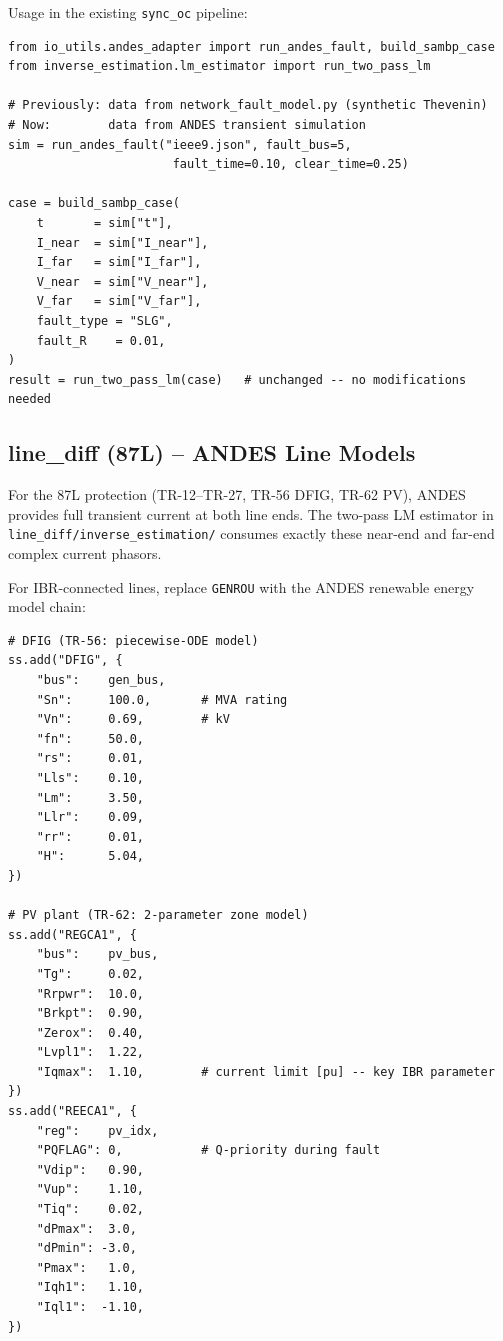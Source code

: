 \documentclass[11pt,a4paper]{article}
\begin{document}
Usage in the existing \texttt{sync\_oc} pipeline:
\begin{lstlisting}[style=python, caption={Run sync\_oc with ANDES instead of synthetic data}]
from io_utils.andes_adapter import run_andes_fault, build_sambp_case
from inverse_estimation.lm_estimator import run_two_pass_lm

# Previously: data from network_fault_model.py (synthetic Thevenin)
# Now:        data from ANDES transient simulation
sim = run_andes_fault("ieee9.json", fault_bus=5,
                       fault_time=0.10, clear_time=0.25)

case = build_sambp_case(
    t       = sim["t"],
    I_near  = sim["I_near"],
    I_far   = sim["I_far"],
    V_near  = sim["V_near"],
    V_far   = sim["V_far"],
    fault_type = "SLG",
    fault_R    = 0.01,
)
result = run_two_pass_lm(case)   # unchanged -- no modifications needed
\end{lstlisting}

\subsection{line\_diff (87L) -- ANDES Line Models}

For the 87L protection (TR-12--TR-27, TR-56 DFIG, TR-62 PV), ANDES
provides full transient current at both line ends. The two-pass LM
estimator in \texttt{line\_diff/inverse\_estimation/} consumes exactly
these near-end and far-end complex current phasors.

For IBR-connected lines, replace \texttt{GENROU} with the ANDES
renewable energy model chain:

\begin{lstlisting}[style=python, caption={Adding DFIG/PV in ANDES for TR-56/TR-62}]
# DFIG (TR-56: piecewise-ODE model)
ss.add("DFIG", {
    "bus":    gen_bus,
    "Sn":     100.0,       # MVA rating
    "Vn":     0.69,        # kV
    "fn":     50.0,
    "rs":     0.01,
    "Lls":    0.10,
    "Lm":     3.50,
    "Llr":    0.09,
    "rr":     0.01,
    "H":      5.04,
})

# PV plant (TR-62: 2-parameter zone model)
ss.add("REGCA1", {
    "bus":    pv_bus,
    "Tg":     0.02,
    "Rrpwr":  10.0,
    "Brkpt":  0.90,
    "Zerox":  0.40,
    "Lvpl1":  1.22,
    "Iqmax":  1.10,        # current limit [pu] -- key IBR parameter
})
ss.add("REECA1", {
    "reg":    pv_idx,
    "PQFLAG": 0,           # Q-priority during fault
    "Vdip":   0.90,
    "Vup":    1.10,
    "Tiq":    0.02,
    "dPmax":  3.0,
    "dPmin": -3.0,
    "Pmax":   1.0,
    "Iqh1":   1.10,
    "Iql1":  -1.10,
})
\end{lstlisting}
\end{document}
